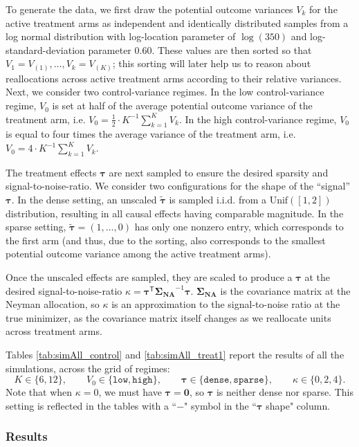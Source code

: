 \documentclass{article}
\newcommand{\bsSigmaN}{\boldsymbol {\Sigma_{\textbf{NA}}}}
\newcommand{\bstau}{\boldsymbol \tau}
\newcommand{\tran}{\mathsf{T}}
\begin{document}
To generate the data, we first draw the potential outcome variances $V_k$ for the active treatment arms as independent and identically distributed samples from a log normal distribution with log-location parameter of $\log(350)$ and log-standard-deviation parameter $0.60$. These values are then sorted so that $V_1 = V_{(1)}, \dots, V_k = V_{(K)}$; this sorting will later help us to reason about reallocations across active treatment arms according to their relative variances. Next, we consider two control-variance regimes.  In the low control-variance regime, $V_0$ is set at half of the average potential outcome variance of the treatment arm, i.e. $V_0 = \tfrac{1}{2}\cdot K^{-1}\sum_{k=1}^K V_k$. In the high control-variance regime, $V_0$ is equal to four times the average variance of the treatment arm, i.e. $V_0 = 4\cdot K^{-1}\sum_{k=1}^K V_k$. 

The treatment effects $\bstau$ are next sampled to ensure the desired sparsity and signal-to-noise-ratio. We consider two configurations for the shape of the ``signal'' $\bstau$. In the dense setting, an unscaled $\tilde{\bstau}$ is sampled i.i.d. from a $\text{Unif}([1, 2])$ distribution, resulting in all causal effects having comparable magnitude. In the sparse setting, $\tilde{\bstau} = (1, \dots, 0)$ has only one nonzero entry, which corresponds to the first arm (and thus, due to the sorting, also corresponds to the smallest potential outcome variance among the active treatment arms). 

Once the unscaled effects are sampled, they are scaled to produce a $\bstau$ at the desired signal-to-noise-ratio $\kappa = \bstau^\tran \bsSigmaN^{-1} \bstau$. $\bsSigmaN$ is the covariance matrix at the Neyman allocation, so $\kappa$ is an approximation to the signal-to-noise ratio at the true minimizer, as the covariance matrix itself changes as we reallocate units across treatment arms. 

Tables \ref{tab:simAll_control} and \ref{tab:simAll_treat1} report the results of all the simulations, across the grid of regimes:
\[
K\in\{6,12\},\qquad
V_0\in\{\texttt{low},\texttt{high}\},\qquad 
\bstau\in\{\texttt{dense},\texttt{sparse}\}, \qquad \kappa\in\{0,2,4\}.
\]
Note that when $\kappa = 0$, we must have $\bstau = \boldsymbol 0$, so $\bstau$ is neither dense nor sparse. This setting is reflected in the tables with a ``$-$" symbol in the ``$\bstau$ shape" column. 

\subsubsection{Results}\label{sec:simResults}
\end{document}
